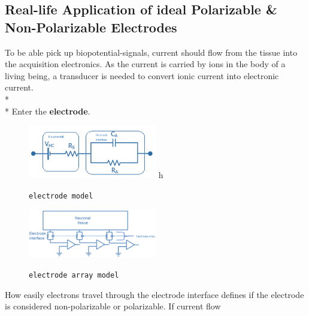     \subsection{Real-life Application of ideal Polarizable \& Non-Polarizable Electrodes} %
    \label{subsec:electrodes}
    To be able pick up biopotential-signals, current should flow from the tissue into the acquisition electronics. As the current is carried by ions in the body of a living being, a transducer is needed to convert ionic current into electronic current.\\*\\*
    Enter the \textbf{electrode}.\\ %
    \begin{figure}
      \centering
      \vspace{-20pt}
      \caption{\texttt{\footnotesize{electrode model}}}
      \includegraphics[width=0.5\textwidth]{images/electrical-probe-model1.png}
      \vspace{-35pt}
      \label{fig:probe-model}h
    \end{figure}
    \begin{figure}
      \centering
      \vspace{-20pt}
      \caption{\texttt{\footnotesize{electrode array model}}}
      \includegraphics[width=0.5\textwidth]{images/electrical-probe-model-arrays.png}
      \vspace{-20pt}
      \label{fig:probe-model-array}
    \end{figure}
    How easily electrons travel through the electrode interface defines if the electrode is considered non-polarizable or polarizable. If current flow 
